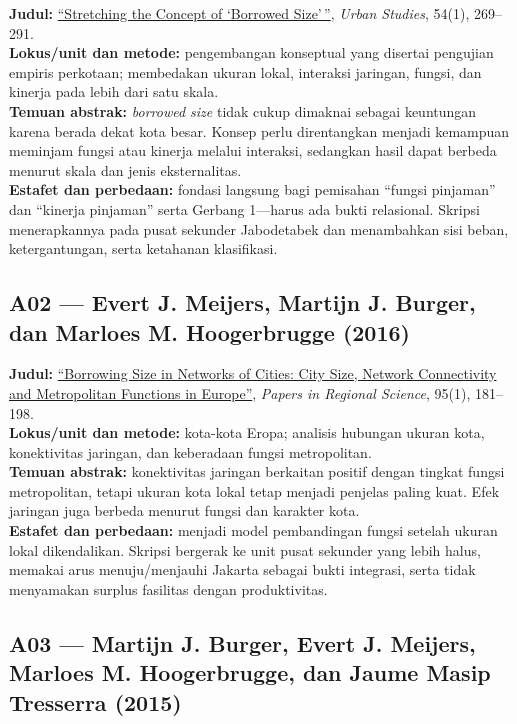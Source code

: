 \documentclass[
  indonesian,
  11pt,
  a4paper,
  oneside,
  openany]{report}
\begin{document}
\textbf{Judul:}
\href{https://doi.org/10.1177/0042098015597642}{``Stretching the Concept
of `Borrowed Size'\,''}, \emph{Urban Studies}, 54(1), 269--291.\\
\textbf{Lokus/unit dan metode:} pengembangan konseptual yang disertai
pengujian empiris perkotaan; membedakan ukuran lokal, interaksi
jaringan, fungsi, dan kinerja pada lebih dari satu skala.\\
\textbf{Temuan abstrak:} \emph{borrowed size} tidak cukup dimaknai
sebagai keuntungan karena berada dekat kota besar. Konsep perlu
direntangkan menjadi kemampuan meminjam fungsi atau kinerja melalui
interaksi, sedangkan hasil dapat berbeda menurut skala dan jenis
eksternalitas.\\
\textbf{Estafet dan perbedaan:} fondasi langsung bagi pemisahan ``fungsi
pinjaman'' dan ``kinerja pinjaman'' serta Gerbang 1---harus ada bukti
relasional. Skripsi menerapkannya pada pusat sekunder Jabodetabek dan
menambahkan sisi beban, ketergantungan, serta ketahanan klasifikasi.

\subsection{A02 --- Evert J. Meijers, Martijn J. Burger, dan Marloes M.
Hoogerbrugge
(2016)}\label{a02-evert-j.-meijers-martijn-j.-burger-dan-marloes-m.-hoogerbrugge-2016}

\textbf{Judul:} \href{https://doi.org/10.1111/pirs.12181}{``Borrowing
Size in Networks of Cities: City Size, Network Connectivity and
Metropolitan Functions in Europe''}, \emph{Papers in Regional Science},
95(1), 181--198.\\
\textbf{Lokus/unit dan metode:} kota-kota Eropa; analisis hubungan
ukuran kota, konektivitas jaringan, dan keberadaan fungsi
metropolitan.\\
\textbf{Temuan abstrak:} konektivitas jaringan berkaitan positif dengan
tingkat fungsi metropolitan, tetapi ukuran kota lokal tetap menjadi
penjelas paling kuat. Efek jaringan juga berbeda menurut fungsi dan
karakter kota.\\
\textbf{Estafet dan perbedaan:} menjadi model pembandingan fungsi
setelah ukuran lokal dikendalikan. Skripsi bergerak ke unit pusat
sekunder yang lebih halus, memakai arus menuju/menjauhi Jakarta sebagai
bukti integrasi, serta tidak menyamakan surplus fasilitas dengan
produktivitas.

\subsection{A03 --- Martijn J. Burger, Evert J. Meijers, Marloes M.
Hoogerbrugge, dan Jaume Masip Tresserra
(2015)}\label{a03-martijn-j.-burger-evert-j.-meijers-marloes-m.-hoogerbrugge-dan-jaume-masip-tresserra-2015}
\end{document}
